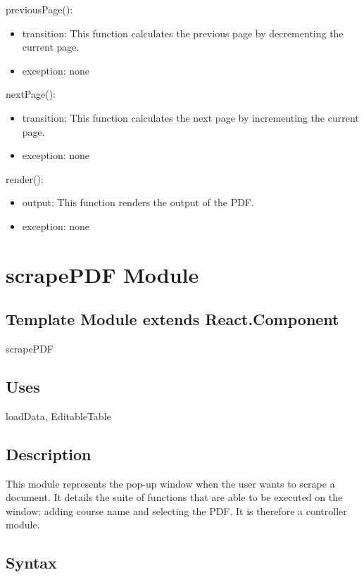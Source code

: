 \documentclass[12pt, titlepage]{article}
\begin{document}
\noindent previousPage():
\begin{itemize}
\item transition: This function calculates the previous page by decrementing the current page.
\item exception: none
\end{itemize}

\noindent nextPage():
\begin{itemize}
\item transition: This function calculates the next page by incrementing the current page.
\item exception: none
\end{itemize}

\noindent render():
\begin{itemize}
\item output: This function renders the output of the PDF.
\item exception: none
\end{itemize}

\newpage

\section{scrapePDF Module}

\subsection{Template Module extends React.Component}

scrapePDF

\subsection{Uses}

loadData, EditableTable

\subsection{Description}
This module represents the pop-up window when the user wants to scrape a document. It details the suite of functions that are able to be executed on the window: adding course name and selecting the PDF. It is therefore a controller module.

\subsection{Syntax}
\end{document}
